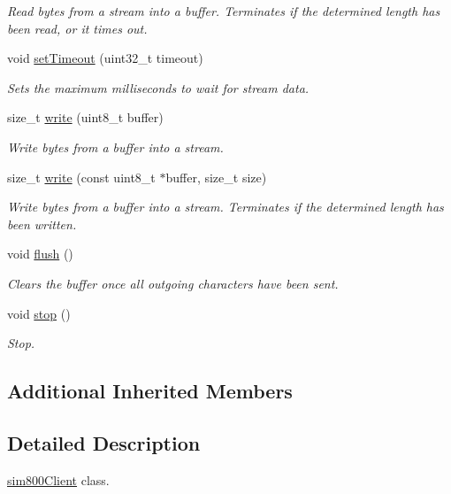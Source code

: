 \begin{DoxyCompactItemize}
\begin{DoxyCompactList}\small\item\em Read bytes from a stream into a buffer. Terminates if the determined length has been read, or it times out. \end{DoxyCompactList}\item 
void \hyperlink{classsim800Client_a10001f737f1331303472de45a2d8faa1}{set\+Timeout} (uint32\+\_\+t timeout)
\begin{DoxyCompactList}\small\item\em Sets the maximum milliseconds to wait for stream data. \end{DoxyCompactList}\item 
size\+\_\+t \hyperlink{classsim800Client_ab730edb73267508cbc261b13e643b12d}{write} (uint8\+\_\+t buffer)
\begin{DoxyCompactList}\small\item\em Write bytes from a buffer into a stream. \end{DoxyCompactList}\item 
size\+\_\+t \hyperlink{classsim800Client_aef786fd9fa179f04b016c7cb916a7f39}{write} (const uint8\+\_\+t $\ast$buffer, size\+\_\+t size)
\begin{DoxyCompactList}\small\item\em Write bytes from a buffer into a stream. Terminates if the determined length has been written. \end{DoxyCompactList}\item 
void \hyperlink{classsim800Client_a2d7b70eec8e0ff108b3c3fee4eb9b559}{flush} ()
\begin{DoxyCompactList}\small\item\em Clears the buffer once all outgoing characters have been sent. \end{DoxyCompactList}\item 
void \hyperlink{classsim800Client_a26d88d095ba02c26e5d5dd8ba22e01c0}{stop} ()
\begin{DoxyCompactList}\small\item\em Stop. \end{DoxyCompactList}\end{DoxyCompactItemize}
\subsection*{Additional Inherited Members}


\subsection{Detailed Description}
\hyperlink{classsim800Client}{sim800\+Client} class. 

